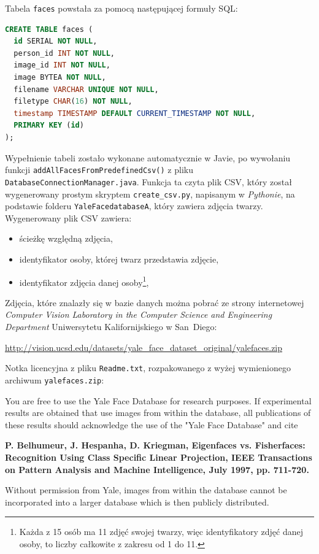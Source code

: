 \documentclass[a4paper,titlepage]{article}
\theoremstyle{break}
\numberwithin{equation}{subsection}
\begin{document}
Tabela \texttt{faces} powstała za pomocą następującej formuły SQL:
\begin{lstlisting}[language=SQL,frame=single]
CREATE TABLE faces (
  id SERIAL NOT NULL,
  person_id INT NOT NULL,
  image_id INT NOT NULL,
  image BYTEA NOT NULL,
  filename VARCHAR UNIQUE NOT NULL,
  filetype CHAR(16) NOT NULL,
  timestamp TIMESTAMP DEFAULT CURRENT_TIMESTAMP NOT NULL,
  PRIMARY KEY (id)
);
\end{lstlisting}
\begin{sloppypar}
Wypełnienie tabeli zostało wykonane automatycznie w Javie, po wywołaniu funkcji \texttt{addAllFacesFromPredefinedCsv()} z pliku \texttt{DatabaseConnectionManager.java}. Funkcja ta czyta plik CSV, który został wygenerowany prostym skryptem \texttt{create\_csv.py}, napisanym w \emph{Pythonie}, na podstawie folderu \texttt{YaleFacedatabaseA}, który zawiera zdjęcia twarzy. Wygenerowany plik CSV zawiera:
\begin{itemize}
	\item ścieżkę względną zdjęcia,
	\item identyfikator osoby, której twarz przedstawia zdjęcie,
	\item identyfikator zdjęcia danej osoby\footnote{Każda z 15 osób ma 11 zdjęć swojej twarzy, więc identyfikatory zdjęć danej osoby, to liczby całkowite z zakresu od 1 do 11.},
\end{itemize}
Zdjęcia, które znalazły się w bazie danych można pobrać ze strony internetowej \emph{Computer Vision Laboratory in the Computer Science and Engineering Department} Uniwersytetu Kalifornijskiego w San~Diego:
\begin{center}
\url{http://vision.ucsd.edu/datasets/yale_face_dataset_original/yalefaces.zip}
\end{center}
Notka licencyjna z pliku \texttt{Readme.txt}, rozpakowanego z wyżej wymienionego archiwum \texttt{yalefaces.zip}:
\begin{displayquote}
You are free to use the Yale Face Database for research purposes.
If experimental results are obtained that use images from within the
database, all publications of these results should acknowledge the use
of the "Yale Face Database" and cite

\textbf{P. Belhumeur, J. Hespanha, D. Kriegman, Eigenfaces vs. Fisherfaces: Recognition Using Class Specific Linear Projection, IEEE Transactions on Pattern Analysis and Machine Intelligence, July 1997, pp. 711-720.}

Without permission from Yale, images
from within the database cannot be incorporated into a larger database
which is then publicly distributed.
\end{displayquote}
\end{sloppypar}
\end{document}
